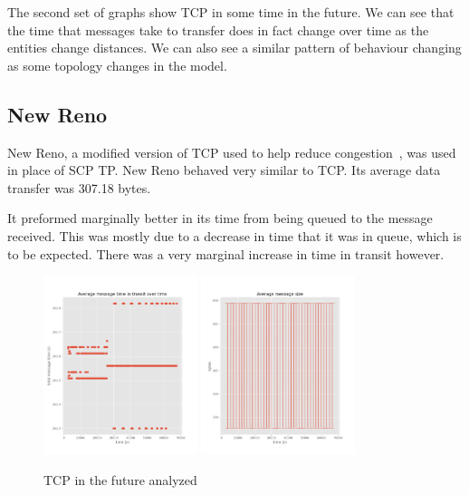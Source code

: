 \documentclass[a4paper,12pt]{article}
\begin{document}
The second set of graphs show TCP in some time in the future. We can see that
the time that messages take to transfer does in fact change over time as the
entities change distances. We can also see a similar pattern of behaviour
changing as some topology changes in the model.

\subsection{New Reno}

New Reno, a modified version of TCP used to help reduce
congestion~\cite{Nahar2016}, was used in place of SCP TP. New Reno behaved very
similar to TCP. Its average data transfer was 307.18 bytes.

It preformed marginally better in its time from being queued to the message
received. This was mostly due to a decrease in time that it was in queue, which
is to be expected. There was a very marginal increase in time in transit
however.

\begin{figure}[h]
  \centering
  \includegraphics[width=0.4\textwidth]{media/new_reno.png}
  \includegraphics[width=0.4\textwidth]{media/new_reno_data.png}
  \caption{TCP in the future analyzed}
\end{figure}
\end{document}
